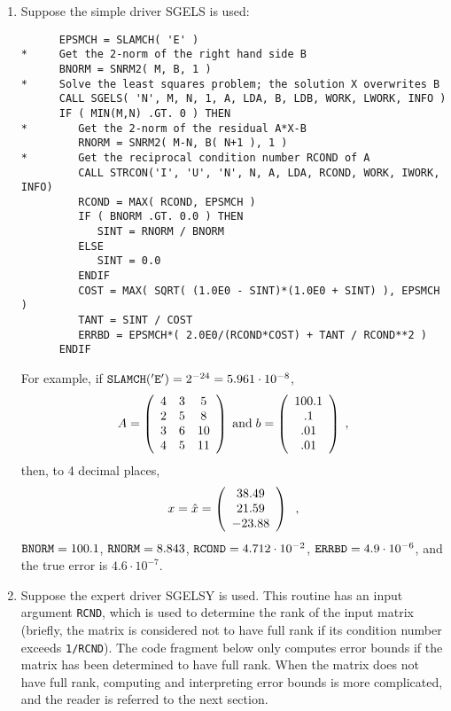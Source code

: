 \begin{enumerate}

\item Suppose the simple driver SGELS is used:

\begin{verbatim}
      EPSMCH = SLAMCH( 'E' )
*     Get the 2-norm of the right hand side B
      BNORM = SNRM2( M, B, 1 )
*     Solve the least squares problem; the solution X overwrites B
      CALL SGELS( 'N', M, N, 1, A, LDA, B, LDB, WORK, LWORK, INFO )
      IF ( MIN(M,N) .GT. 0 ) THEN
*        Get the 2-norm of the residual A*X-B
         RNORM = SNRM2( M-N, B( N+1 ), 1 )
*        Get the reciprocal condition number RCOND of A
         CALL STRCON('I', 'U', 'N', N, A, LDA, RCOND, WORK, IWORK, INFO)
         RCOND = MAX( RCOND, EPSMCH )
         IF ( BNORM .GT. 0.0 ) THEN
            SINT = RNORM / BNORM
         ELSE
            SINT = 0.0
         ENDIF
         COST = MAX( SQRT( (1.0E0 - SINT)*(1.0E0 + SINT) ), EPSMCH )
         TANT = SINT / COST
         ERRBD = EPSMCH*( 2.0E0/(RCOND*COST) + TANT / RCOND**2 )
      ENDIF
\end{verbatim}

For example,
if ${\tt SLAMCH('E')} = 2^{-24} = 5.961 \cdot 10^{-8}$,
\[
A = \bmat{ccc} 4 & 3 & 5 \\ 2 & 5 & 8 \\ 3 & 6 & 10 \\ 4 & 5 & 11 \emat
\; {\rm and} \;
b = \bmat{c} 100.1 \\ .1 \\ .01 \\ .01 \emat \; ,
\]
then, to 4 decimal places,
\[
x = \hat{x} = \bmat{c} 38.49 \\ 21.59 \\ -23.88 \emat \; \; ,
\]
${\tt BNORM} = 100.1$,
${\tt RNORM} = 8.843$,
${\tt RCOND} = 4.712 \cdot 10^{-2}$,
${\tt ERRBD} = 4.9 \cdot 10^{-6}$, and the true error
is $4.6 \cdot 10^{-7}$.

\item Suppose the expert driver SGELSY is used.
This routine has an input argument {\tt RCND},
which is used to determine the rank of the input matrix (briefly,
the matrix is considered not to have full rank if its condition
number exceeds {\tt 1/RCND}).
The code fragment below only computes error bounds
if the matrix has been determined to have full rank.
When the matrix does not have full rank,
computing and interpreting error bounds is more complicated, and
the reader is referred to the next section.


\end{enumerate}
